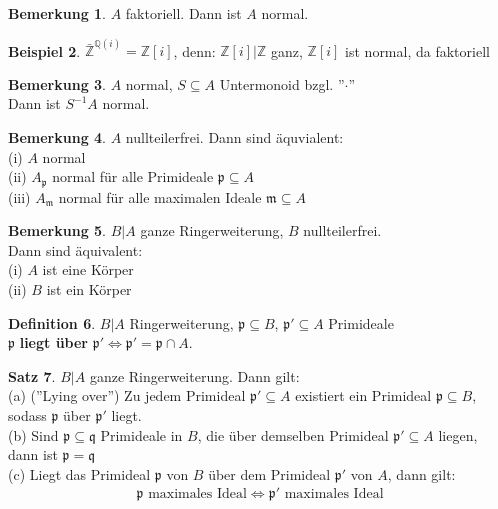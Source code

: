\documentclass[10pt,a4paper,numbers=endperiod]{scrreprt}
\theoremstyle{definition}
\newtheorem{satz}{Satz}[section]
\newtheorem{defi}[satz]{Definition}
\newtheorem{bem}[satz]{Bemerkung}
\newtheorem{bsp}[satz]{Beispiel}
\def\QQ{{\mathbb Q}}
\def\ZZ{{\mathbb Z}}
\begin{document}
\begin{bem}
	$A$ faktoriell. Dann ist $A$ normal.
\end{bem}

\begin{bsp}
	$\bar{\ZZ}^{\QQ(i)} = \ZZ[i]$, denn: $\ZZ[i]|\ZZ$ ganz, $\ZZ[i]$ ist normal, da faktoriell
\end{bsp}

\begin{bem}
	$A$ normal, $S \subseteq A$ Untermonoid bzgl. ''$\cdot$''\\
	Dann ist $S^{-1}A$ normal.
\end{bem}

\begin{bem}
	$A$ nullteilerfrei. Dann sind äquvialent:\\
	(i) $A$ normal\\
	(ii) $A_\mathfrak{p}$ normal für alle Primideale $\mathfrak{p} \subseteq A$\\
	(iii) $A_\mathfrak{m}$ normal für alle maximalen Ideale $\mathfrak{m} \subseteq
	 A$\
\end{bem}

\begin{bem}
	$B|A$ ganze Ringerweiterung, $B$ nullteilerfrei.\\
	Dann sind äquivalent:\\
	(i) $A$ ist eine Körper\\
	(ii) $B$ ist ein Körper
\end{bem}

\begin{defi}
	$B|A$ Ringerweiterung, $\mathfrak{p} \subseteq B$, $\mathfrak{p}' \subseteq A$ Primideale\\
	$\mathfrak{p}$ \textbf{liegt über} $\mathfrak{p}' \Leftrightarrow \mathfrak{p}' = \mathfrak{p} \cap A$.
\end{defi}

\begin{satz}
	$B|A$ ganze Ringerweiterung. Dann gilt:\\
	(a) (''Lying over'') Zu jedem Primideal $\mathfrak{p}' \subseteq A$ existiert ein Primideal $\mathfrak{p} \subseteq B$, sodass $\mathfrak{p}$ über $\mathfrak{p}'$ liegt.\\
	(b) Sind $\mathfrak{p} \subseteq \mathfrak{q}$ Primideale in $B$, die über demselben Primideal $\mathfrak{p}' \subseteq A$ liegen, dann ist $\mathfrak{p} = \mathfrak{q}$\\
	(c) Liegt das Primideal $\mathfrak{p}$ von $B$ über dem Primideal $\mathfrak{p}'$ von $A$, dann gilt: \begin{align*}
		\mathfrak{p} \text{ maximales Ideal} \Leftrightarrow \mathfrak{p}' \text{ maximales Ideal}
	\end{align*}
\end{satz}
\end{document}
